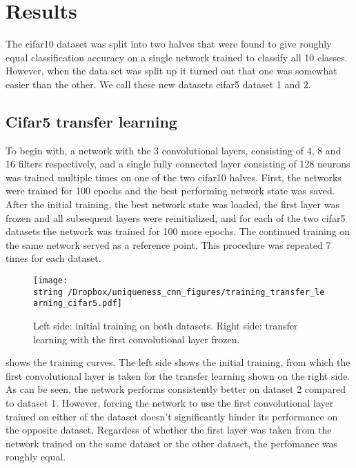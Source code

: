 \section{Results}

The cifar10 dataset was split into two halves that were found to give roughly equal classification accuracy on a single network trained to classify all 10 classes. However, when the data set was split up it turned out that one was somewhat easier than the other. We call these new datasets cifar5 dataset 1 and 2.

\subsection{Cifar5 transfer learning}

To begin with, a network with the 3 convolutional layers, consisting of 4, 8 and 16 filters respectively, and a single fully connected layer consisting of 128 neurons was trained multiple times on one of the two cifar10 halves. First, the networks were trained for 100 epochs and the best performing network state was saved. After the initial training, the best network state was loaded, the first layer was frozen and all subsequent layers were reinitialized, and for each of the two cifar5 datasets the network was trained for 100 more epochs. The continued training on the same network served as a reference point. This procedure was repeated 7 times for each dataset.

\begin{figure}[h!]
\begin{center}
  \texttt{[image: \\string~/Dropbox/uniqueness\_cnn\_figures/training\_transfer\_learning\_cifar5.pdf]}
\end{center}
\caption{Left side: initial training on both datasets. Right side: transfer learning with the first convolutional layer frozen.}
\label{fig:init_training_cifar5}
\end{figure}

 shows the training curves. The left side shows the initial training, from which the first convolutional layer is taken for the transfer learning shown on the right side. 
As can be seen, the network performs consistently better on dataset 2 compared to dataset 1. However, forcing the network to use the first convolutional layer trained on either of the dataset doesn't significantly hinder its performance on the opposite dataset. Regardess of whether the first layer was taken from the network trained on the same dataset or the other dataset, the perfomance was roughly equal.

